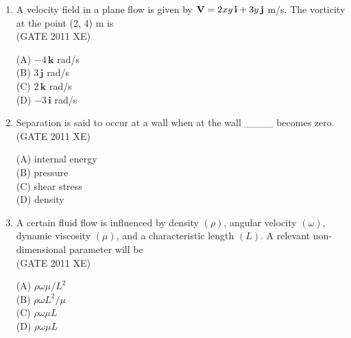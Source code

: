 \documentclass[journal,12pt,onecolumn]{IEEEtran}
\begin{document}
\begin{enumerate}
\begin{enumerate}
\begin{enumerate}
\hfill{(GATE 2011 XE)} \\
\begin{multicols}{2}
(A) $P_A = 10 P_B$\\
(B) $P_B = 10 P_A$\\
(C) $P_A = P_B$\\
(D) Additional data is required to compare the two pressures.
\end{multicols}

\item A velocity field in a plane flow is given by ${\bf V} = 2 x y\, \mathbf{i} + 3 y\, \mathbf{j}$ m/s. The vorticity at the point (2, 4) m is\\

\hfill{(GATE 2011 XE)} \\
\begin{multicols}{4}
(A) $-4\, \mathbf{k}$ rad/s\\
(B) $3\, \mathbf{j}$ rad/s\\
(C) $2\, \mathbf{k}$ rad/s\\
(D) $-3\, \mathbf{i}$ rad/s
\end{multicols}

\item Separation is said to occur at a wall when at the wall \_\_\_\_ becomes zero.\\

\hfill{(GATE 2011 XE)} \\
\begin{multicols}{4}
(A) internal energy\\
(B) pressure\\
(C) shear stress\\
(D) density
\end{multicols}

\newpage

\item A certain fluid flow is influenced by density $(\rho)$, angular velocity $(\omega)$, dynamic viscosity $(\mu)$, and a characteristic length $(L)$. A relevant non-dimensional parameter will be\\
\hfill{(GATE 2011 XE)} \\
\begin{multicols}{4}
(A) $\rho \omega \mu / L^2$\\
(B) $\rho \omega L^2 / \mu$\\
(C) $\rho \omega \mu L$\\
(D) $\rho \omega \mu L$
\end{multicols}


\end{enumerate}
\end{enumerate}
\end{enumerate}
\end{document}
